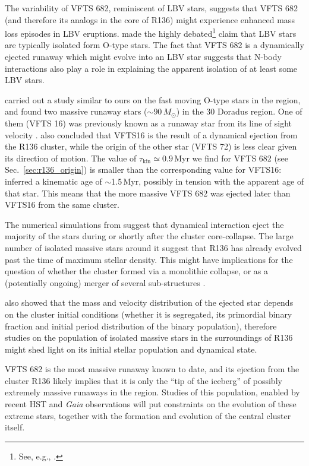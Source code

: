 \documentclass[apjl,twocolumn]{emulateapj}
\DeclareRobustCommand{\Secref}[1]{Sec.~\ref{#1}}
\begin{document}
The variability of VFTS 682, reminiscent of LBV stars, suggests
that VFTS 682 (and therefore its analogs in the core of R136) might
experience enhanced mass loss episodes in LBV eruptions. \citet{smith:15} made the highly
debated\footnote{See, e.g., \cite{humphreys:16, davidson:16, smith:16}.}
claim that LBV stars are typically isolated form O-type stars. The fact that VFTS 682 is a dynamically
ejected runaway which might evolve into an LBV star suggests that
N-body interactions also play a role in explaining the apparent
isolation of at least some LBV stars. 

\citet{lennon:18} carried out a study similar to ours on the fast
moving O-type stars
in the region, and found two massive runaway stars
($\sim$$90\,M_\odot$) in the 30 Doradus region. One of them (VFTS 16)
was previously known as a runaway star from its line of sight velocity
\citep[][]{evans:10}. \citet{lennon:18} also concluded that VFTS16 is 
the result of a dynamical ejection from the R136 cluster, while the
origin of the other star (VFTS 72) is less clear given its direction
of motion. The value of $\tau_\mathrm{kin}\simeq0.9$\,Myr we find for
VFTS 682 (see \Secref{sec:r136_origin}) is smaller than the
corresponding value for VFTS16: \cite{lennon:18} inferred a kinematic
age of $\sim$1.5\,Myr, possibly in tension with the apparent age of that star. This means that the more
massive VFTS 682 was ejected later than VFTS16 from the same cluster.

The numerical simulations from \cite{oh:16} suggest that dynamical
interaction eject the majority of the stars during or shortly after the cluster
core-collapse. The large number of isolated massive stars around it
suggest that R136 has already evolved past the
time of maximum stellar density. This might have implications for the
question of whether the cluster formed via a monolithic collapse, or
as a (potentially ongoing) merger of several sub-structures \citep[e.g.,]{sabbi:12}.

\citet{oh:16} also showed that the mass and velocity distribution of the ejected star depends on the cluster initial conditions
(whether it is segregated, its primordial binary fraction and initial period
distribution of the binary population), therefore studies on
the population of isolated massive stars in the surroundings of R136
might shed light on its initial stellar population and dynamical
state. 

VFTS 682 is the most massive runaway known to date, and its ejection
from the cluster R136 likely implies that it is only the ``tip of the
iceberg'' of possibly extremely massive runaways in the
region. Studies of this population, enabled by recent HST and \emph{Gaia} observations will put constraints on the evolution
of these extreme stars, together with the formation and evolution of
the central cluster itself.
\end{document}
